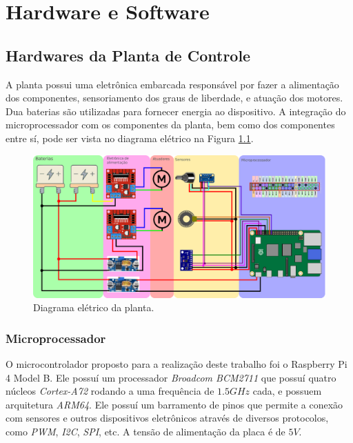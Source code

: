 \chapter{Hardware e Software}%
    \label{chp:hs}
	
	\section{Hardwares da Planta de Controle}
    	A planta possui uma eletrônica embarcada responsável por fazer a alimentação dos componentes, sensoriamento dos graus de liberdade, e atuação dos motores. Dua baterias são utilizadas para fornecer energia ao dispositivo. A integração do microprocessador com os componentes da planta, bem como dos componentes entre sí, pode ser vista no diagrama elétrico na Figura \ref{img:diagrama}.
    	
    	\begin{figure}[h]
            \centering
            \includegraphics[width=\columnwidth]{Imagens/cap2/montagem3.eps}
            \caption{Diagrama elétrico da planta.}
            \label{img:diagrama}
        \end{figure}
        
        \subsection{Microprocessador}
    	    
    	    O microcontrolador proposto para a realização deste trabalho foi o Raspberry Pi 4 Model B. Ele possuí um processador \textit{Broadcom BCM2711} que possuí quatro núcleos \textit{Cortex-A72} rodando a uma frequência de $1.5 GHz$ cada, e possuem arquitetura \textit{ARM64}. Ele possuí um barramento de pinos que permite a conexão com sensores e outros dispositivos eletrônicos através de diversos protocolos, como \textit{PWM}, \textit{I2C}, \textit{SPI}, etc. A tensão de alimentação da placa é de $5V$.
    	
